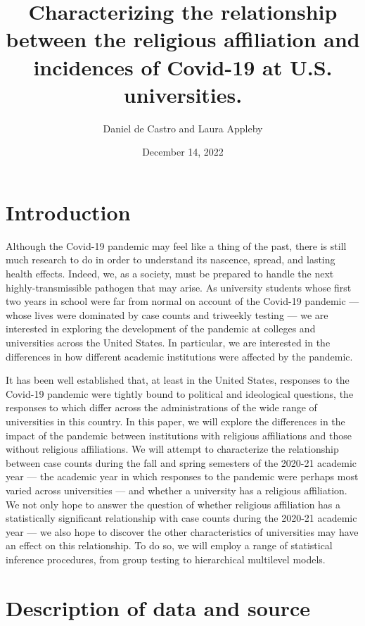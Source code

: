 \documentclass[
]{article}
\title{Characterizing the relationship between the religious affiliation
and incidences of Covid-19 at U.S. universities.}
\author{Daniel de Castro and Laura Appleby}
\date{December 14, 2022}
\begin{document}
\maketitle

\hypertarget{introduction}{%
\section{Introduction}\label{introduction}}

Although the Covid-19 pandemic may feel like a thing of the past, there
is still much research to do in order to understand its nascence,
spread, and lasting health effects. Indeed, we, as a society, must be
prepared to handle the next highly-transmissible pathogen that may
arise. As university students whose first two years in school were far
from normal on account of the Covid-19 pandemic --- whose lives were
dominated by case counts and triweekly testing --- we are interested in
exploring the development of the pandemic at colleges and universities
across the United States. In particular, we are interested in the
differences in how different academic institutions were affected by the
pandemic.

It has been well established that, at least in the United States,
responses to the Covid-19 pandemic were tightly bound to political and
ideological questions, the responses to which differ across the
administrations of the wide range of universities in this country. In
this paper, we will explore the differences in the impact of the
pandemic between institutions with religious affiliations and those
without religious affiliations. We will attempt to characterize the
relationship between case counts during the fall and spring semesters of
the 2020-21 academic year --- the academic year in which responses to
the pandemic were perhaps most varied across universities --- and
whether a university has a religious affiliation. We not only hope to
answer the question of whether religious affiliation has a statistically
significant relationship with case counts during the 2020-21 academic
year --- we also hope to discover the other characteristics of
universities may have an effect on this relationship. To do so, we will
employ a range of statistical inference procedures, from group testing
to hierarchical multilevel models.

\hypertarget{description-of-data-and-source}{%
\section{Description of data and
source}\label{description-of-data-and-source}}
\end{document}
